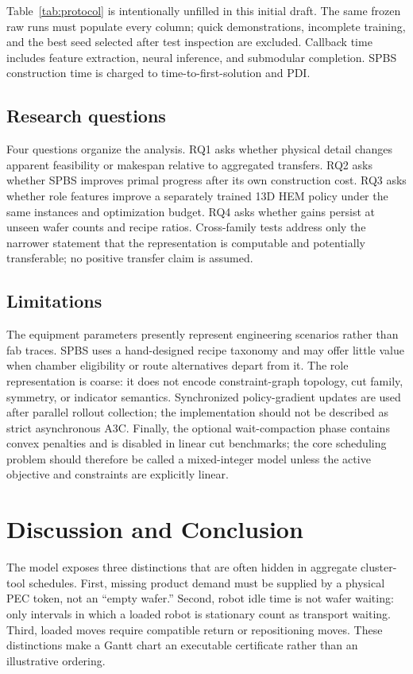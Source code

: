 \documentclass{ifacconf}
\begin{document}
Table~\ref{tab:protocol} is intentionally unfilled in this initial draft. The same frozen raw runs must populate every column; quick demonstrations, incomplete training, and the best seed selected after test inspection are excluded. Callback time includes feature extraction, neural inference, and submodular completion. SPBS construction time is charged to time-to-first-solution and PDI.

\subsection{Research questions}

Four questions organize the analysis. RQ1 asks whether physical detail changes apparent feasibility or makespan relative to aggregated transfers. RQ2 asks whether SPBS improves primal progress after its own construction cost. RQ3 asks whether role features improve a separately trained 13D HEM policy under the same instances and optimization budget. RQ4 asks whether gains persist at unseen wafer counts and recipe ratios. Cross-family tests address only the narrower statement that the representation is computable and potentially transferable; no positive transfer claim is assumed.

\subsection{Limitations}

The equipment parameters presently represent engineering scenarios rather than fab traces. SPBS uses a hand-designed recipe taxonomy and may offer little value when chamber eligibility or route alternatives depart from it. The role representation is coarse: it does not encode constraint-graph topology, cut family, symmetry, or indicator semantics. Synchronized policy-gradient updates are used after parallel rollout collection; the implementation should not be described as strict asynchronous A3C. Finally, the optional wait-compaction phase contains convex penalties and is disabled in linear cut benchmarks; the core scheduling problem should therefore be called a mixed-integer model unless the active objective and constraints are explicitly linear.

\section{Discussion and Conclusion}

The model exposes three distinctions that are often hidden in aggregate cluster-tool schedules. First, missing product demand must be supplied by a physical PEC token, not an ``empty wafer.'' Second, robot idle time is not wafer waiting: only intervals in which a loaded robot is stationary count as transport waiting. Third, loaded moves require compatible return or repositioning moves. These distinctions make a Gantt chart an executable certificate rather than an illustrative ordering.
\end{document}
